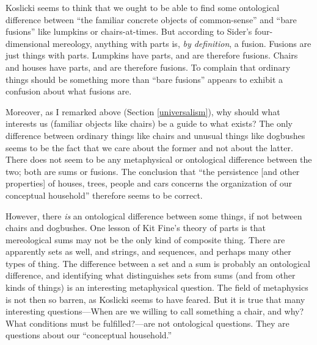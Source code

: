 \documentclass[11pt]{article}
\begin{document}
\begin{spacing}{1.5}
Koslicki seems to think that we ought to be able to find some
ontological difference between ``the familiar concrete objects of
common-sense'' and ``bare fusions'' like lumpkins or chairs-at-times.
But according to Sider's four-dimensional mereology, anything with
parts is, {\em by definition}, a fusion.  Fusions are just things with
parts.  Lumpkins have parts, and are therefore fusions.  Chairs and
houses have parts, and are therefore fusions.  To complain that
ordinary things should be something more than ``bare fusions'' appears
to exhibit a confusion about what fusions are.

Moreover, as I remarked above (Section \ref{universalism}), why should
what interests us (familiar objects like chairs) be a guide to what
exists?  The only difference between ordinary things like chairs and
unusual things like dogbushes seems to be the fact that we care about
the former and not about the latter.  There does not seem to be any
metaphysical or ontological difference between the two; both are sums
or fusions.  The conclusion that ``the persistence [and other
  properties] of houses, trees, people and cars concerns the
organization of our conceptual household'' therefore seems to be
correct.

However, there {\em is} an ontological difference between some things,
if not between chairs and dogbushes.  One lesson of Kit Fine's theory
of parts is that mereological sums may not be the only kind of
composite thing.  There are apparently sets as well, and strings, and
sequences, and perhaps many other types of thing.  The difference
between a set and a sum is probably an ontological difference, and
identifying what distinguishes sets from sums (and from other kinds of
things) is an interesting metaphysical question.  The field of
metaphysics is not then so barren, as Koslicki seems to have feared.
But it is true that many interesting questions---When are we willing
to call something a chair, and why?  What conditions must be
fulfilled?---are not ontological questions.  They are questions about
our ``conceptual household.''

\ifstandalone
\end{spacing}


\fi
\end{document}
